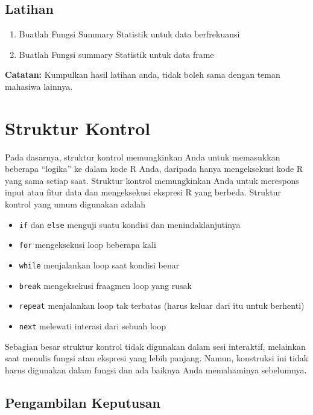 \documentclass[
]{book}
\providecommand{\tightlist}{%
  \setlength{\itemsep}{0pt}\setlength{\parskip}{0pt}}
\begin{document}
\hypertarget{latihan-3}{%
\section{Latihan}\label{latihan-3}}

\begin{enumerate}
\def\labelenumi{\arabic{enumi}.}
\tightlist
\item
  Buatlah Fungsi Summary Statistik untuk data berfrekuansi
\item
  Buatlah Fungsi summary Statistik untuk data frame
\end{enumerate}

\textbf{Catatan:} Kumpulkan hasil latihan anda, tidak boleh sama dengan teman mahasiwa lainnya.

\hypertarget{struktur-kontrol}{%
\chapter{Struktur Kontrol}\label{struktur-kontrol}}

Pada dasarnya, struktur kontrol memungkinkan Anda untuk memasukkan beberapa ``logika'' ke dalam kode R Anda, daripada hanya mengeksekusi kode R yang sama setiap saat. Struktur kontrol memungkinkan Anda untuk merespons input atau fitur data dan mengeksekusi ekspresi R yang berbeda. Struktur kontrol yang umum digunakan adalah

\begin{itemize}
\tightlist
\item
  \texttt{if} dan \texttt{else} menguji suatu kondisi dan menindaklanjutinya
\item
  \texttt{for} mengeksekusi loop beberapa kali
\item
  \texttt{while} menjalankan loop saat kondisi benar
\item
  \texttt{break} mengeksekusi fraagmen loop yang rusak
\item
  \texttt{repeat} menjalankan loop tak terbatas (harus keluar dari itu untuk berhenti)
\item
  \texttt{next} melewati interasi dari sebuah loop
\end{itemize}

Sebagian besar struktur kontrol tidak digunakan dalam sesi interaktif, melainkan saat menulis fungsi atau ekspresi yang lebih panjang. Namun, konstruksi ini tidak harus digunakan dalam fungsi dan ada baiknya Anda memahaminya sebelumnya.

\hypertarget{pengambilan-keputusan}{%
\section{Pengambilan Keputusan}\label{pengambilan-keputusan}}
\end{document}
